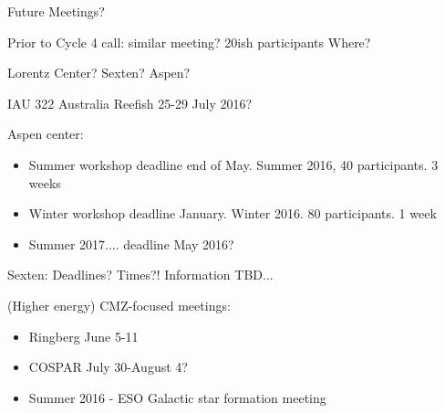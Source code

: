 Future Meetings?

Prior to Cycle 4 call: similar meeting?  20ish participants
Where?  

Lorentz Center?  Sexten?  Aspen?

IAU 322 Australia Reefish 25-29 July 2016?

Aspen center:
\begin{itemize}
\item Summer workshop deadline end of May.  Summer 2016, 40 participants.  3 weeks
\item Winter workshop deadline January.  Winter 2016.  80 participants.  1 week
\item Summer 2017.... deadline May 2016?
\end{itemize}

Sexten: Deadlines?  Times?!  Information TBD...

(Higher energy) CMZ-focused meetings:
\begin{itemize}
\item Ringberg June 5-11 
\item COSPAR July 30-August 4?
\item Summer 2016 - ESO Galactic star formation meeting
\end{itemize}